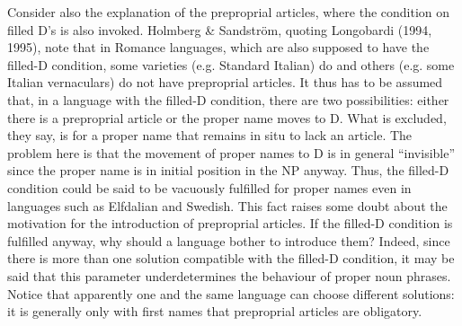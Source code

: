 
Consider also the explanation of the preproprial articles, where the condition on filled D’s is also invoked. Holmberg \& Sandström, quoting Longobardi (1994, 1995), note that in Romance languages, which are also supposed to have the filled-D condition, some varieties (e.g. Standard Italian) do and others (e.g. some Italian vernaculars) do not have preproprial articles. It thus has to be assumed that, in a language with the filled-D condition, there are two possibilities: either there is a preproprial article or the proper name moves to D. What is excluded, they say, is for a proper name that remains in situ to lack an article. The problem here is that the movement of proper names to D is in general “invisible” since the proper name is in initial position in the NP anyway. Thus, the filled-D condition could be said to be vacuously fulfilled for proper names even in languages such as Elfdalian and Swedish. This fact raises some doubt about the motivation for the introduction of preproprial articles. If the filled-D condition is fulfilled anyway, why should a language bother to introduce them? Indeed, since there is more than one solution compatible with the filled-D condition, it may be said that this parameter underdetermines the behaviour of proper noun phrases. Notice that apparently one and the same language can choose different solutions: it is generally only with first names that preproprial articles are obligatory. 


